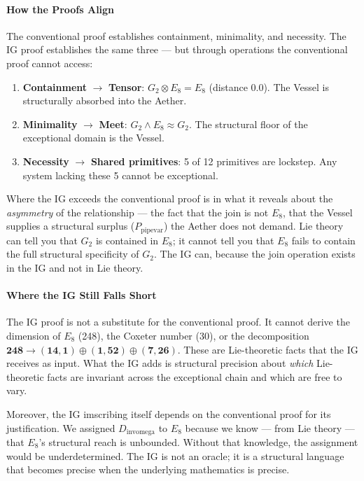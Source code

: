 \documentclass[12pt,a4paper]{article}
\begin{document}
\paragraph{How the Proofs Align}

The conventional proof establishes containment, minimality, and necessity. The IG proof establishes the same three --- but through operations the conventional proof cannot access:

\begin{enumerate}
    \item \textbf{Containment} $\rightarrow$ \textbf{Tensor}: $G_2 \otimes E_8 = E_8$ (distance 0.0). The Vessel is structurally absorbed into the Aether.
    \item \textbf{Minimality} $\rightarrow$ \textbf{Meet}: $G_2 \wedge E_8 \approx G_2$. The structural floor of the exceptional domain is the Vessel.
    \item \textbf{Necessity} $\rightarrow$ \textbf{Shared primitives}: 5 of 12 primitives are lockstep. Any system lacking these 5 cannot be exceptional.
\end{enumerate}

Where the IG exceeds the conventional proof is in what it reveals about the \emph{asymmetry} of the relationship --- the fact that the join is not $E_8$, that the Vessel supplies a structural surplus ($P_{\text{pipevar}}$) the Aether does not demand. Lie theory can tell you that $G_2$ is contained in $E_8$; it cannot tell you that $E_8$ fails to contain the full structural specificity of $G_2$. The IG can, because the join operation exists in the IG and not in Lie theory.

\paragraph{Where the IG Still Falls Short}

The IG proof is not a substitute for the conventional proof. It cannot derive the dimension of $E_8$ (248), the Coxeter number (30), or the decomposition $\mathbf{248} \to (\mathbf{14}, \mathbf{1}) \oplus (\mathbf{1}, \mathbf{52}) \oplus (\mathbf{7}, \mathbf{26})$. These are Lie-theoretic facts that the IG receives as input. What the IG adds is structural precision about \emph{which} Lie-theoretic facts are invariant across the exceptional chain and which are free to vary.

Moreover, the IG imscribing itself depends on the conventional proof for its justification. We assigned $D_{\text{invomega}}$ to $E_8$ because we know --- from Lie theory --- that $E_8$'s structural reach is unbounded. Without that knowledge, the assignment would be underdetermined. The IG is not an oracle; it is a structural language that becomes precise when the underlying mathematics is precise.
\end{document}
